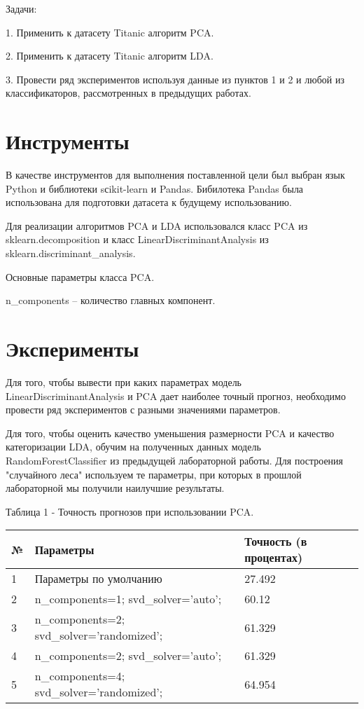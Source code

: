\documentclass[a4paper,12pt]{article}
\begin{document}
	\vspace{0.5cm}
	Задачи: 
	
	\vspace{0.5cm}
	1. Применить к датасету Titanic алгоритм PCA.
	
	\vspace{0.5cm}
	2. Применить к датасету Titanic алгоритм LDA.
	
	\vspace{0.5cm}
	3. Провести ряд экспериментов используя данные из пунктов 1 и 2 и любой из классификаторов, рассмотренных в предыдущих работах.
	
	
\newpage\section{Инструменты} 
	В качестве инструментов для выполнения поставленной цели был выбран язык Python и библиотеки sсikit-learn и Pandas.
	Бибилотека Pandas была использована для подготовки датасета к будущему использованию.
	
	\vspace{0.5cm}
	Для реализации алгоритмов PCA и LDA использовался класс PCA из sklearn.decomposition и класс LinearDiscriminantAnalysis из sklearn.discriminant\_analysis.
	
	\vspace{0.5cm}
	Основные параметры класса PCA.
	
	\vspace{0.5cm}
	n\_components – количество главных компонент.

	
\newpage\section{Эксперименты}
	Для того, чтобы вывести при каких параметрах модель LinearDiscriminantAnalysis и PCA дает наиболее точный прогноз, необходимо провести ряд экспериментов с разными значениями параметров. 
	
	\vspace{0.5cm}
	Для того, чтобы оценить качество уменьшения размерности PCA и качество категоризации LDA,  обучим на полученных данных модель RandomForestClassifier из предыдущей лабораторной работы. Для построения "случайного леса" используем те параметры, при которых в прошлой лабораторной мы получили наилучшие результаты.


	\vspace{0.5cm}
	Таблица 1 - Точность прогнозов  при использовании PCA.
\begin{longtable}{|p{1cm}|p{9cm}|p{3cm}|}
\hline
№ & Параметры & Точность (в процентах) \\ 
\hline 
1 & Параметры по умолчанию & 27.492 \\
\hline
2 & n\_components=1; svd\_solver='auto';  & 60.12 \\
\hline 
3 & n\_components=2; svd\_solver='randomized';& 61.329 \\
\hline
4 & n\_components=2; svd\_solver='auto';  & 61.329 \\
\hline 
5 & n\_components=4; svd\_solver='randomized'; & 64.954 \\
\hline
\end{longtable}
\end{document}
